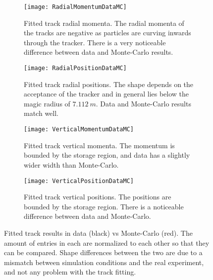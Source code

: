    \begin{figure}[]
    \centering
        \begin{subfigure}[t]{0.47\textwidth}
            \centering
            \texttt{[image: RadialMomentumDataMC]}
            \caption{Fitted track radial momenta. The radial momenta of the tracks are negative as particles are curving inwards through the tracker. There is a very noticeable difference between data and Monte-Carlo results.}
        \end{subfigure}
        \hspace{5mm}
        \begin{subfigure}[t]{0.47\textwidth}
            \centering
            \texttt{[image: RadialPositionDataMC]}
            \caption{Fitted track radial positions. The shape depends on the acceptance of the tracker and in general lies below the magic radius of $\SI{7.112}{m}$. Data and Monte-Carlo results match well.}
        \end{subfigure}
        \vspace{2mm}
        \begin{subfigure}[t]{0.47\textwidth}
            \centering
            \texttt{[image: VerticalMomentumDataMC]}
            \caption{Fitted track vertical momenta. The momentum is bounded by the storage region, and data has a slightly wider width than Monte-Carlo.}
        \end{subfigure}%
        \hspace{5mm}
        \begin{subfigure}[t]{0.47\textwidth}
            \centering
            \texttt{[image: VerticalPositionDataMC]}
            \caption{Fitted track vertical positions. The positions are bounded by the storage region. There is a noticeable difference between data and Monte-Carlo.}
        \end{subfigure}%
    \caption[Fitted tracks in data compared to Monte-Carlo, radial and vertical momentum and position distributions]{Fitted track results in data (black) vs Monte-Carlo (red). The amount of entries in each are normalized to each other so that they can be compared. Shape differences between the two are due to a mismatch between simulation conditions and the real experiment, and not any problem with the track fitting.}
    \label{fig:TracksDataMCSecond}
    \end{figure}



\clearpage %


